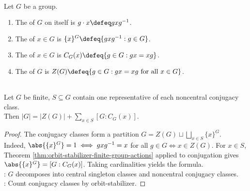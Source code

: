 \begin{definition} \label{def:conjugacy-class-centralizer} \\
Let $G$ be a group.
\begin{enumerate}[label=(\roman*)]
\setlength{\itemsep}{0pt}
\item The  of $G$ on itself is $g\cdot x\defeq gxg^{-1}$.
\item The  of $x\in G$ is $\{x\}^{G}\defeq\{gxg^{-1}:g\in G\}$.
\item The  of $x\in G$ is $C_G(x)\defeq\{g\in G:gx=xg\}$.
\item The  of $G$ is $Z(G)\defeq\{g\in G:gx=xg\text{ for all }x\in G\}$.
\end{enumerate}
\end{definition}

\begin{theorem} \label{thm:finite-group-class-equation} \\
Let $G$ be finite, $S\subseteq G$ contain one representative of each noncentral conjugacy class.\\
Then $|G|=|Z(G)|+\sum\limits_{x\in S}[G:C_G(x)]$.
\begin{proof}
The conjugacy classes form a partition $G=Z(G)\sqcup\bigsqcup\limits_{x\in S}\{x\}^{G}$.\\
Indeed, $\abs{\{x\}^{G}}=1 \iff gxg^{-1}=x$ for all $g\in G \iff x\in Z(G)$. For $x\in S$, Theorem \ref{thm:orbit-stabilizer-finite-group-actions} applied to conjugation gives $\abs{\{x\}^{G}}=[G:C_G(x)]$. Taking cardinalities yields the formula.\\
: $G$ decomposes into central singleton classes and noncentral conjugacy classes.\\
: Count conjugacy classes by orbit-stabilizer.
\end{proof}
\end{theorem}
